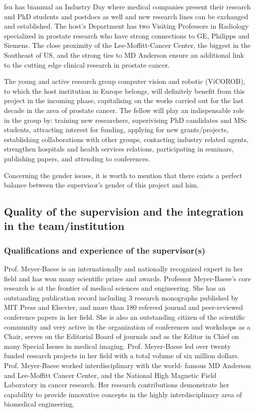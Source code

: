 \ac{fsu} has biannual an Industry Day where medical companies present their research and PhD students and postdocs as well and new research lines can be exchanged and established.
The host's Department has two Visiting Professors in Radiology specialized in prostate research who have strong connections to GE, Philipps and Siemens.
The close proximity of the Lee-Moffitt-Cancer Center, the biggest in the Southeast of US, and the strong ties to MD Anderson ensure an additional link to the cutting edge clinical research in prostate cancer.

The young and active research group computer vision and robotic (ViCOROB), to which the host institution in Europe belongs, will definitely benefit from this project in the incoming phase, capitalising on the works carried out for the last decade in the area of prostate cancer. The fellow will play an indispensable role in the group by: training new researchers, superivising PhD candidates and MSc students, attracting interest for funding, applying for new grants/projects,  establishing collaborations with other groups, contacting industry related agents, strengthen hospitals and health services relations, participating in seminars, publishing papers, and attending to conferences.

Concerning the gender issues, it is worth to mention that there exists a perfect balance between the supervisor's gender of this project and him.

\subsection{Quality of the supervision and the integration in the team/institution}
\label{sec:supervision}

\subsubsection*{Qualifications and experience of the supervisor(s)}

Prof. Meyer-Baese is an internationally and nationally recognized expert in her field and has won many scientific prizes and awards. Professor Meyer-Baese's core research is at the frontier of medical sciences and engineering. She has an outstanding publication record including 3 research monographs published by MIT Press and Elsevier, and more than 180 refereed journal and peer-reviewed conference papers in her field. She is also an outstanding citizen of the scientific community and very active in the organization of conferences and workshops as a Chair, serves on the Editorial Board of journals and as the Editor in Chief on many Special Issues in medical imaging. Prof. Meyer-Baese led over twenty funded research projects in her field with a total volume of six million dollars. Prof. Meyer-Baese worked interdisciplinary with the world- famous MD Anderson and Lee-Moffitt Cancer Center, and the National High Magnetic Field Laboratory in cancer research. Her research contributions demonstrate her capability to provide innovative concepts in the highly interdisciplinary area of biomedical engineering.

